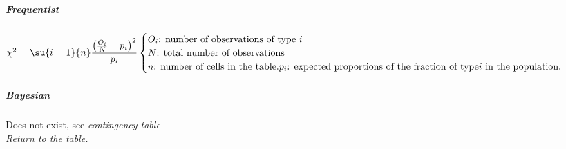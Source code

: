 \subparagraph{Frequentist}
$\chi^{2} = \su{i=1}{n}\dfrac{\left(\frac{O_{i}}{N} - p_{i} \right)^{2}}{p_{i}}
\begin{cases}
    O_{i}\text{: number of observations of type }i \\
    N\text{: total number of observations}\\
    n\text{: number of cells in the table.}
    p_{i}\text{: expected proportions of the fraction of type}i\text{ in the population.}
\end{cases}
$

\subparagraph{Bayesian}
Does not exist, see \emph{contingency table}\\

\textit{\hyperref[statistical_method_table]{Return to the table.}}
